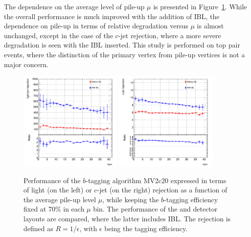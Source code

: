 The dependence on the average level of pile-up $\mu$ is presented in Figure~\ref{fig:btagging_vsMU}. While the overall performance is much improved with the addition of IBL, the dependence on pile-up in terms of relative degradation versus $\mu$ is almost unchanged, except in the case of the $c$-jet rejection, where a more severe degradation is seen with the IBL inserted. This study is performed on top pair events, where the distinction of the primary vertex from pile-up vertices is not a major concern.

\begin{figure}
\centering
\includegraphics[width=0.45\textwidth]{Images/IBL_paper/chapter02_Physics/btagging/avgmu_MV2c20__l_flat}
\includegraphics[width=0.45\textwidth]{Images/IBL_paper/chapter02_Physics/btagging/avgmu_MV2c20__c_flat}
\caption{\label{fig:btagging_vsMU} Performance of the $b$-tagging algorithm MV2c20 expressed in terms of light (on the left) or $c$-jet (on the right) rejection as a function of the average pile-up level $\mu$, while keeping the $b$-tagging efficiency fixed at 70\% in each $\mu$ bin. The performance of the \runone and \runtwo detector layouts are compared, where the latter includes IBL. The rejection is defined as $R=1/\epsilon$, with $\epsilon$ being the tagging efficiency.}
\end{figure}


